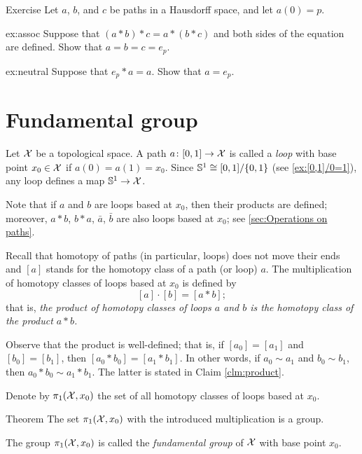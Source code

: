\begin{thm}{Exercise}\label{ex:assoc+neutral}
Let $a$, $b$, and $c$ be paths in a Hausdorff space, and let $a(0)=p$.

\begin{subthm}{ex:assoc}
Suppose that $(a*b)*c= a*(b*c)$
and both sides of the equation are defined.
Show that $a=b=c=e_p$.
\end{subthm}

\begin{subthm}{ex:neutral}
Suppose that $e_p*a= a$.
Show that $a=e_p$.
\end{subthm}


\end{thm}

\section{Fundamental group}

Let $\mathcal{X}$ be a topological space.
A path $a\colon[0,1]\to\mathcal{X}$ is called a \emph{loop} with base point $x_0\in\mathcal{X}$ if $a(0)=a(1)=x_0$.
Since $\mathbb{S}^1\cong[0,1]/\{0,1\}$ (see \ref{ex:[0,1]/0=1}),
any loop defines a map $\mathbb{S}^1\to \mathcal{X}$.

Note that if $a$ and $b$ are loops based at $x_0$, then their products are defined; moreover, $a*b$, $b*a$, $\bar a$, $\bar b$ are also loops based at $x_0$; see \ref{sec:Operations on paths}.


Recall that homotopy of paths (in particular, loops) does not move their ends
and $[a]$ stands for the homotopy class of a path (or loop) $a$.
The multiplication of homotopy classes of loops based at $x_0$ is defined by
\[[a]\cdot [b]=[a*b];\]
that is, \textit{the product of homotopy classes of loops $a$ and $b$ is the homotopy class of the product $a*b$.}

Observe that the product is well-defined;
that is, if $[a_0]= [a_1]$ and $[b_0]=[b_1]$, then $[a_0*b_0]=[a_1*b_1]$.
In other words, if $a_0\sim a_1$ and $b_0\sim b_1$, then $a_0*b_0\sim a_1*b_1$.
The latter is stated in Claim \ref{clm:product}.

Denote by $\pi_1(\mathcal{X},x_0)$ the set of all homotopy classes of loops based at $x_0$.

\begin{thm}{Theorem}\label{thm:pi1}
The set $\pi_1(\mathcal{X},x_0)$ with the introduced multiplication is a group.
\end{thm}

The group $\pi_1(\mathcal{X},x_0)$ is called the \emph{fundamental group} of $\mathcal{X}$ with base point $x_0$.

